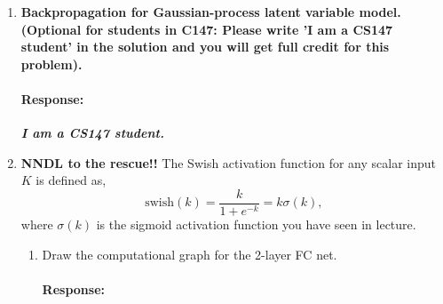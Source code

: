 \documentclass{article}
\newcommand{\T}{\bf{T}}
\newcommand{\x}{\bf{x}}
\newcommand{\W}{\bf{W}}
\newcommand{\pd}[2]{\frac{\partial{#1}}{\partial{#2}}}
\newenvironment{response}{\begin{responseframe}\vspace{-10pt}\paragraph{Response:}}{\end{responseframe}}
\renewcommand{\it}[1]{\textit{{#1}}}
\renewcommand{\bf}[1]{\textbf{{#1}}}
\newcommand{\ib}[1]{\it{\bf{{#1}}}}
\begin{document}
\begin{enumerate}
\begin{enumerate}
\begin{response}
                \end{response}
            \item Calculate the gradient: $\nabla_{\W} \mathcal{L}$.
                \begin{response}
                    Given the computational graph drawn in (b),
                    \begin{align*}
                        \pd{\mathcal{L}}{(\W^{\T} \W \x - \x)} 
                        &= \W^{\T} \W \x - \x \\
                    \pd{\mathcal{L}}{(\W^{\T})}
                        &= (\W^{\T} \W \x - \x) (\W \x)^{\T} && (*) \\
                    \pd{\mathcal{L}}{(\W \x)}
                        &= \W (\W^{\T} \W \x - \x) \\
                    \pd{\mathcal{L}}{\W}
                        &= \W (\W^{\T} \W \x - \x) \x^{\T} && (**) \\
                    \end{align*}
                    so 
                    $ 
                    \nabla_{\W} \mathcal{L} = (*) + (**)
                    = \W (\W^{\T} \W \x - \x) \x^{\T}
                    + (\W^{\T} \W \x - \x) (\W \x)^{\T}
                    $.
                \end{response}
        \end{enumerate}
    \item \bf{Backpropagation for Gaussian-process latent variable model. (Optional for students in
        C147: Please write 'I am a CS147 student' in the solution and you will get full credit for
    this problem).}
        \begin{response}
            \ib{I am a CS147 student.}
        \end{response}
        \newpage
    \item \bf{NNDL to the rescue!!}
        The Swish activation function for any scalar input $K$ is defined as,
        \[
            \text{swish}(k) = \frac{k}{1 + e^{-k}} = k \sigma (k),
        \]
        where $\sigma(k)$ is the sigmoid activation function you have seen in lecture.
        \begin{enumerate}
            \item Draw the computational graph for the 2-layer FC net.
                \begin{response}
                    \hfil
                    \vspace{10em}


\end{response}
\end{enumerate}
\end{enumerate}
\end{document}
